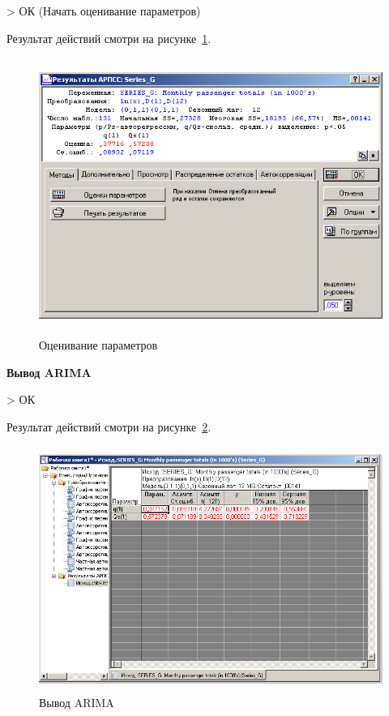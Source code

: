 > ОК (Начать оценивание параметров)

Результат действий смотри на рисунке~\ref{fig:12}.

\begin{figure}[!h]
  \centering

  \includegraphics[height=9cm]
  {inc/12.PNG}

  \caption{Оценивание параметров}

  \label{fig:12}
\end{figure}

\begin{center}
  \textbf{Вывод ARIMA}
\end{center}

> ОК

Результат действий смотри на рисунке~\ref{fig:13}.

\begin{figure}[!h]
  \centering

  \includegraphics[height=8cm]
  {inc/13.PNG}

  \caption{Вывод ARIMA}

  \label{fig:13}
\end{figure}

